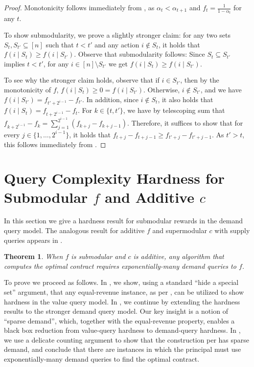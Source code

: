 \documentclass[11pt]{article}
\newtheorem{theorem}{Theorem}
\begin{document}
\begin{proof}
    Monotonicity follows immediately from , as $\alpha_t < \alpha_{t+1}$ and $f_t= \frac{1}{1-\alpha_t}$ for any $t$.

    To show submodularity, we prove a slightly stronger claim: for any two sets $S_t, S_{t'} \subseteq [n]$ such that $t<t'$ and any action $i \notin S_t$, it holds that $f(i \mid S_t) \ge f(i\mid S_{t'})$.
    Observe that submodularity follows:
    Since $S_t \subseteq S_{t'}$ implies $t<t'$, for any $i \in [n] \setminus S_{t'}$ we get $f(i \mid S_t) \ge f(i\mid S_{t'})$.
    
    To see why the stronger claim holds, observe that if $i \in S_{t'}$, then by the monotonicity of $f$, $f(i \mid S_{t})\ge 0 =f(i \mid S_{t'})$. Otherwise, $i \notin S_{t'}$, and we have $f( i \mid S_{t'} ) = f_{t'+2^{i-1}} - f_{t'}$.
    In addition, since $i \notin S_{t}$, it also holds that $f( i \mid S_t ) = f_{t+2^{i-1}} - f_t$. 
    For $k\in \{t,t'\}$, we have by telescoping sum that
    $f_{k+2^{i-1}} - f_{k} = \sum_{j=1}^{2^{i-1}} (f_{k+j} - f_{k+j-1}).$
    Therefore, it suffices to show that for every $j \in \{1,\ldots,2^{i-1}\}$, it holds that $f_{t+j} - f_{t+j-1} \ge f_{t'+j} - f_{t'+j-1}$.
    As $t' > t$, this follows immediately from .
\end{proof}

\section{Query Complexity Hardness for Submodular $f$ and Additive $c$}\label{sec:demandHardness}

In this section we give a hardness result for submodular rewards in the demand query model. The analogous result for additive $f$ and supermodular $c$ with supply queries appears in .

\begin{theorem}\label{thm:expDemandQueries}
    When $f$ is submodular and $c$ is additive, any algorithm that computes the optimal contract requires exponentially-many demand queries to $f$.
\end{theorem}

To prove  we proceed as follows. In , we show, using a standard ``hide a special set'' argument, that any equal-revenue instance, as per , can be utilized to show hardness in the value query model.
In , we continue by extending the hardness results to the stronger demand query model.
Our key insight is a notion of ``sparse demand'', which, together with the equal-revenue property, enables a black box reduction from value-query hardness to demand-query hardness.
In , we use a delicate counting argument to show that the construction per  has sparse demand, and conclude that there are instances in which the principal must use exponentially-many demand queries to find the optimal contract.
\end{document}
